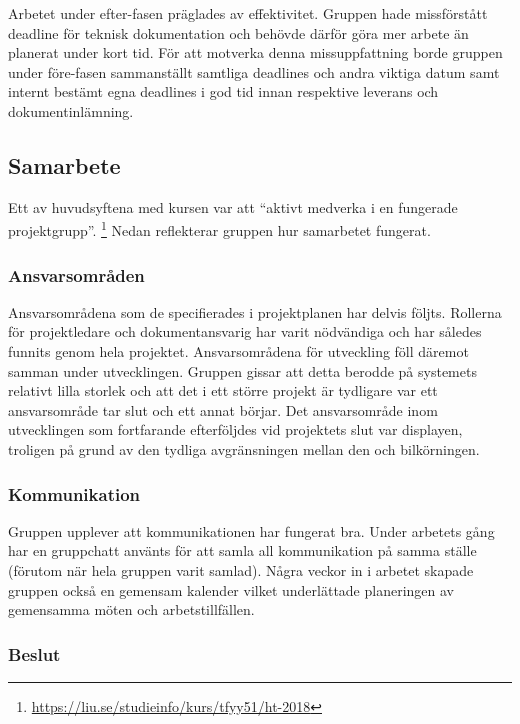 \documentclass[10pt,oneside,swedish]{lips}
\begin{document}
Arbetet under efter-fasen präglades av effektivitet. Gruppen hade missförstått
deadline för teknisk dokumentation och behövde därför göra mer arbete än
planerat under kort tid. För att motverka denna missuppfattning borde gruppen
under före-fasen sammanställt samtliga deadlines och andra viktiga datum samt
internt bestämt egna deadlines i god tid innan respektive leverans och
dokumentinlämning.

\subsection{Samarbete}

Ett av huvudsyftena med kursen var att ``aktivt medverka i en fungerade
projektgrupp''. \footnote{\url{https://liu.se/studieinfo/kurs/tfyy51/ht-2018}}
Nedan reflekterar gruppen hur samarbetet fungerat.

\subsubsection{Ansvarsområden}

Ansvarsområdena som de specifierades i projektplanen har delvis följts.
Rollerna för projektledare och dokumentansvarig har varit nödvändiga och har
således funnits genom hela projektet. Ansvarsområdena för utveckling föll
däremot samman under utvecklingen. Gruppen gissar att detta berodde på systemets
relativt lilla storlek och att det i ett större projekt är tydligare var ett
ansvarsområde tar slut och ett annat börjar. Det ansvarsområde inom utvecklingen
som fortfarande efterföljdes vid projektets slut var displayen, troligen på
grund av den tydliga avgränsningen mellan den och bilkörningen.

\subsubsection{Kommunikation}

Gruppen upplever att kommunikationen har fungerat bra. Under arbetets gång har
en gruppchatt använts för att samla all kommunikation på samma ställe (förutom
när hela gruppen varit samlad). Några veckor in i arbetet skapade gruppen också
en gemensam kalender vilket underlättade planeringen av gemensamma möten och
arbetstillfällen.

\subsubsection{Beslut}
\end{document}
